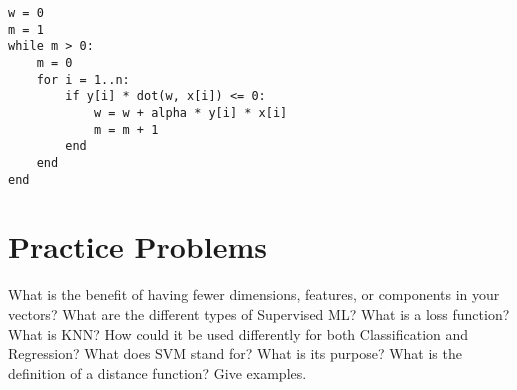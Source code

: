 \begin{verbatim}
w = 0
m = 1
while m > 0:
    m = 0
    for i = 1..n:
        if y[i] * dot(w, x[i]) <= 0:
            w = w + alpha * y[i] * x[i]
            m = m + 1
        end
    end
end
\end{verbatim}

\section{Practice Problems}

\begin{outline}[enumerate]
    \1 What is the benefit of having fewer dimensions, features, or components in your vectors?
    \1 What are the different types of Supervised ML?
    \1 What is a loss function?
    \1 What is KNN? How could it be used differently for both Classification and Regression?
    \1 What does SVM stand for? What is its purpose?
    \1 What is the definition of a distance function? Give examples.
\end{outline}
